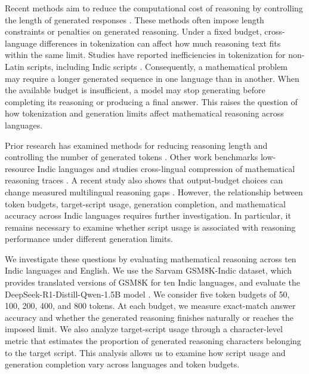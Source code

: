 \documentclass[11pt]{article}
\begin{document}
Recent methods aim to reduce the computational cost of reasoning by controlling the length of generated responses \citep{aggarwal2025l1, hou2025thinkprune}. These methods often impose length constraints or penalties on generated reasoning. Under a fixed budget, cross-language differences in tokenization can affect how much reasoning text fits within the same limit. Studies have reported inefficiencies in tokenization for non-Latin scripts, including Indic scripts \citep{srivastava2026tokenizertax, shravan2026brahmic}. Consequently, a mathematical problem may require a longer generated sequence in one language than in another. When the available budget is insufficient, a model may stop generating before completing its reasoning or producing a final answer. This raises the question of how tokenization and generation limits affect mathematical reasoning across languages.

Prior research has examined methods for reducing reasoning length and controlling the number of generated tokens \citep{liu2026laser, shorterbetter2025}. Other work benchmarks low-resource Indic languages and studies cross-lingual compression of mathematical reasoning traces \citep{maheshwari2025indicparam, wan2026mcd, dipta2026ganitllm}. A recent study also shows that output-budget choices can change measured multilingual reasoning gaps \citep{goyal2026mindthecap}. However, the relationship between token budgets, target-script usage, generation completion, and mathematical accuracy across Indic languages requires further investigation. In particular, it remains necessary to examine whether script usage is associated with reasoning performance under different generation limits.

We investigate these questions by evaluating mathematical reasoning across ten Indic languages and English. We use the Sarvam GSM8K-Indic dataset, which provides translated versions of GSM8K for ten Indic languages, and evaluate the DeepSeek-R1-Distill-Qwen-1.5B model \citep{sarvam_gsm8k_indic, cobbe2021gsm8k, deepseek2025r1}. We consider five token budgets of 50, 100, 200, 400, and 800 tokens. At each budget, we measure exact-match answer accuracy and whether the generated reasoning finishes naturally or reaches the imposed limit. We also analyze target-script usage through a character-level metric that estimates the proportion of generated reasoning characters belonging to the target script. This analysis allows us to examine how script usage and generation completion vary across languages and token budgets.
\end{document}
